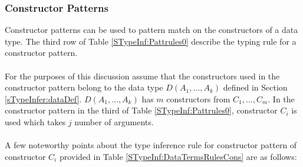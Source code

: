 \documentclass[11pt]{article}
\begin{document}
\subsubsection {Constructor Patterns}
Constructor patterns can be used to pattern match on the constructors of a data type. The third row of Table \ref{STypeInf:Pattrules0} describe the typing rule for a constructor pattern.
~~\\~~\\ 
For the purposes of this discussion assume that the constructors used in the constructor pattern belong to the data type ${D(A_1,\ldots,A_k)}$ defined in Section \ref {sTypeInfer:dataDef}. ${D(A_1,\ldots,A_k)}$  has ${m}$ constructors from ${C_1,\ldots,C_m}$. In the constructor pattern in the third of Table \ref{STypeInf:Pattrules0}, constructor ${C_i}$ is used which takes ${j}$ number of arguments.
~~\\~~\\
A few noteworthy points about the type inference rule for constructor pattern of constructor ${C_i}$ provided in Table \ref {STypeInf:DataTermsRulesCons} are as follows:
\end{document}
